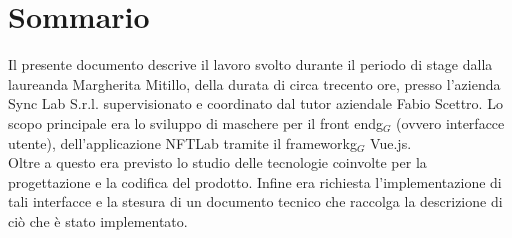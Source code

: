 
\cleardoublepage
{}
{}
\begingroup
\let\clearpage\relax
\let\cleardoublepage\relax
\let\cleardoublepage\relax

\chapter*{Sommario}

Il presente documento descrive il lavoro svolto durante il periodo di stage dalla laureanda Margherita Mitillo, della durata di circa trecento ore, presso l'azienda Sync Lab S.r.l. supervisionato e coordinato dal tutor aziendale Fabio Scettro.
Lo scopo principale era lo sviluppo di maschere per il \gls{front endg}$_G$ (ovvero interfacce utente), dell'applicazione NFTLab tramite il \gls{frameworkg}$_G$ Vue.js.\\
Oltre a questo era previsto lo studio delle tecnologie coinvolte per la progettazione e la codifica del prodotto.
Infine era richiesta l'implementazione di tali interfacce e la stesura di un documento tecnico che raccolga la descrizione di ciò che è stato implementato.

%
%

\endgroup			

\vfill

